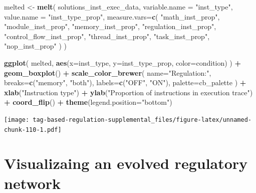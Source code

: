 \documentclass[]{book}
\newenvironment{Shaded}{\begin{snugshade}}{\end{snugshade}}
\newcommand{\DataTypeTok}[1]{\textcolor[rgb]{0.13,0.29,0.53}{#1}}
\newcommand{\KeywordTok}[1]{\textcolor[rgb]{0.13,0.29,0.53}{\textbf{#1}}}
\newcommand{\NormalTok}[1]{#1}
\newcommand{\OperatorTok}[1]{\textcolor[rgb]{0.81,0.36,0.00}{\textbf{#1}}}
\newcommand{\StringTok}[1]{\textcolor[rgb]{0.31,0.60,0.02}{#1}}
\begin{document}
\begin{Shaded}
\begin{Highlighting}[]
\NormalTok{melted <-}\StringTok{ }\KeywordTok{melt}\NormalTok{(}
\NormalTok{  solutions_inst_exec_data,}
  \DataTypeTok{variable.name =} \StringTok{"inst_type"}\NormalTok{,}
  \DataTypeTok{value.name =} \StringTok{"inst_type_prop"}\NormalTok{,}
  \DataTypeTok{measure.vars=}\KeywordTok{c}\NormalTok{(}
    \StringTok{"math_inst_prop"}\NormalTok{,}
    \StringTok{"module_inst_prop"}\NormalTok{,}
    \StringTok{"memory_inst_prop"}\NormalTok{,}
    \StringTok{"regulation_inst_prop"}\NormalTok{,}
    \StringTok{"control_flow_inst_prop"}\NormalTok{,}
    \StringTok{"thread_inst_prop"}\NormalTok{,}
    \StringTok{"task_inst_prop"}\NormalTok{,}
    \StringTok{"nop_inst_prop"}
\NormalTok{  )}
\NormalTok{)}

\KeywordTok{ggplot}\NormalTok{( melted, }\KeywordTok{aes}\NormalTok{(}\DataTypeTok{x=}\NormalTok{inst_type, }\DataTypeTok{y=}\NormalTok{inst_type_prop, }\DataTypeTok{color=}\NormalTok{condition) ) }\OperatorTok{+}
\StringTok{  }\KeywordTok{geom_boxplot}\NormalTok{() }\OperatorTok{+}
\StringTok{  }\KeywordTok{scale_color_brewer}\NormalTok{(}
    \DataTypeTok{name=}\StringTok{"Regulation:"}\NormalTok{,}
    \DataTypeTok{breaks=}\KeywordTok{c}\NormalTok{(}\StringTok{"memory"}\NormalTok{, }\StringTok{"both"}\NormalTok{),}
    \DataTypeTok{labels=}\KeywordTok{c}\NormalTok{(}\StringTok{"OFF"}\NormalTok{, }\StringTok{"ON"}\NormalTok{),}
    \DataTypeTok{palette=}\NormalTok{cb_palette}
\NormalTok{  ) }\OperatorTok{+}
\StringTok{  }\KeywordTok{xlab}\NormalTok{(}\StringTok{"Instruction type"}\NormalTok{) }\OperatorTok{+}
\StringTok{  }\KeywordTok{ylab}\NormalTok{(}\StringTok{"Proportion of instructions in execution trace"}\NormalTok{) }\OperatorTok{+}
\StringTok{  }\KeywordTok{coord_flip}\NormalTok{() }\OperatorTok{+}
\StringTok{  }\KeywordTok{theme}\NormalTok{(}\DataTypeTok{legend.position=}\StringTok{"bottom"}\NormalTok{)}
\end{Highlighting}
\end{Shaded}

\texttt{[image: tag-based-regulation-supplemental\_files/figure-latex/unnamed-chunk-110-1.pdf]}

\hypertarget{visualizaing-an-evolved-regulatory-network-1}{%
\section{Visualizaing an evolved regulatory network}\label{visualizaing-an-evolved-regulatory-network-1}}
\end{document}
